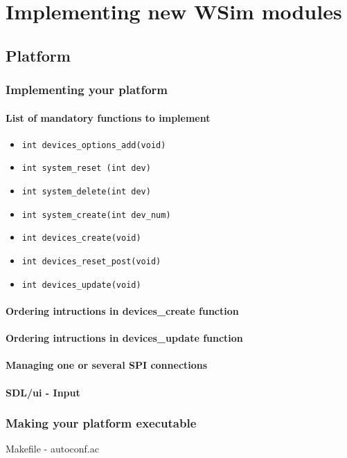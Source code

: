 \documentclass[a4paper,10pt]{report}
\begin{document}
\chapter{Implementing new WSim modules}

\section{Platform}
\subsection{Implementing your platform}
\subsubsection{List of mandatory functions to implement}
\begin{itemize}
  \item \verb$int devices_options_add(void)$
  \item \verb$int system_reset (int dev)$
  \item \verb$int system_delete(int dev)$
  \item \verb$int system_create(int dev_num)$
  \item \verb$int devices_create(void)$
  \item \verb$int devices_reset_post(void)$
  \item \verb$int devices_update(void)$
\end{itemize}

\subsubsection{Ordering intructions in devices\_create function}

\subsubsection{Ordering intructions in devices\_update function}

\subsubsection{Managing one or several SPI connections}

\subsubsection{SDL/ui - Input}

\subsection{Making your platform executable}
Makefile - autoconf.ac
\end{document}
